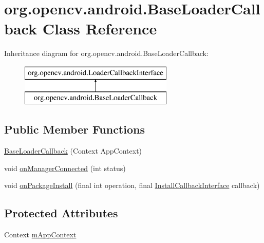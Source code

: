 \hypertarget{classorg_1_1opencv_1_1android_1_1_base_loader_callback}{}\section{org.\+opencv.\+android.\+Base\+Loader\+Callback Class Reference}
\label{classorg_1_1opencv_1_1android_1_1_base_loader_callback}
Inheritance diagram for org.\+opencv.\+android.\+Base\+Loader\+Callback\+:\begin{figure}[H]
\begin{center}
\leavevmode
\includegraphics[height=2.000000cm]{classorg_1_1opencv_1_1android_1_1_base_loader_callback}
\end{center}
\end{figure}
\subsection*{Public Member Functions}
\begin{DoxyCompactItemize}
\item 
\mbox{\hyperlink{classorg_1_1opencv_1_1android_1_1_base_loader_callback_aab909a71e602ef7ac00a53b0114e2375}{Base\+Loader\+Callback}} (Context App\+Context)
\item 
void \mbox{\hyperlink{classorg_1_1opencv_1_1android_1_1_base_loader_callback_a9d397061f3f7713e91c06685462bc12d}{on\+Manager\+Connected}} (int status)
\item 
void \mbox{\hyperlink{classorg_1_1opencv_1_1android_1_1_base_loader_callback_a2d6f2c826a2b94af9a46cc5e28a43bf2}{on\+Package\+Install}} (final int operation, final \mbox{\hyperlink{interfaceorg_1_1opencv_1_1android_1_1_install_callback_interface}{Install\+Callback\+Interface}} callback)
\end{DoxyCompactItemize}
\subsection*{Protected Attributes}
\begin{DoxyCompactItemize}
\item 
Context \mbox{\hyperlink{classorg_1_1opencv_1_1android_1_1_base_loader_callback_aac85fd9df548c4e068f1480e7f33bbf8}{m\+App\+Context}}
\end{DoxyCompactItemize}
